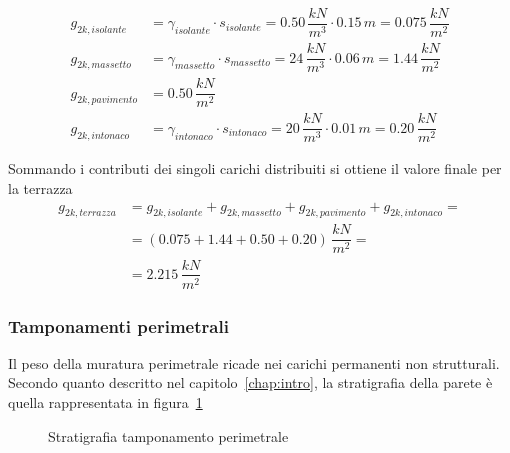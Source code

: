 \begin{align*}
 g_{2k, isolante} &= \gamma_{isolante}\cdot s_{isolante} = 0.50\,\dfrac{kN}{m^3}\cdot 0.15\,\si{m} = 0.075\,\dfrac{kN}{m^2}\\
 g_{2k, massetto} &= \gamma_{massetto}\cdot s_{massetto} = 24\,\dfrac{kN}{m^3}\cdot 0.06\,\si{m} = 1.44\,\dfrac{kN}{m^2}\\
 g_{2k, pavimento} &= 0.50\,\dfrac{kN}{m^2}\\
 g_{2k, intonaco} &= \gamma_{intonaco}\cdot s_{intonaco} = 20\,\dfrac{kN}{m^3}\cdot 0.01\,\si{m} = 0.20\,\dfrac{kN}{m^2}
\end{align*}

Sommando i contributi dei singoli carichi distribuiti si ottiene il valore finale per la terrazza
 \begin{align*}
	g_{2k, terrazza} &= g_{2k, isolante} + g_{2k, massetto} + g_{2k, pavimento} + g_{2k, intonaco} =\\ &= (0.075 + 1.44 + 0.50 + 0.20)\,\dfrac{kN}{m^2} =\\&=
	2.215\,\dfrac{kN}{m^2}
 \end{align*}

\subsubsection*{Tamponamenti perimetrali}
Il peso della muratura perimetrale ricade nei carichi permanenti non strutturali. Secondo quanto descritto nel capitolo~\ref{chap:intro}, la stratigrafia della parete è quella rappresentata in figura~\ref{fig:stratigrafiaTamponamento}

\begin{figure}
 \centering
 \caption{Stratigrafia tamponamento perimetrale}
 \label{fig:stratigrafiaTamponamento}
\end{figure}

